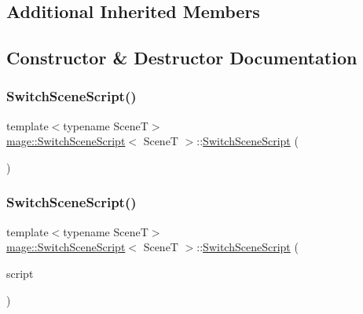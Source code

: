\subsection*{Additional Inherited Members}


\subsection{Constructor \& Destructor Documentation}
\hypertarget{classmage_1_1_switch_scene_script_aefd104d1ddabdd4709c8682e89c79655}{}\label{classmage_1_1_switch_scene_script_aefd104d1ddabdd4709c8682e89c79655} 
\subsubsection{\texorpdfstring{Switch\+Scene\+Script()}{SwitchSceneScript()}\hspace{0.1cm}{\footnotesize\ttfamily [1/3]}}
{\footnotesize\ttfamily template$<$typename SceneT$>$ \\
\hyperlink{classmage_1_1_switch_scene_script}{mage\+::\+Switch\+Scene\+Script}$<$ SceneT $>$\+::\hyperlink{classmage_1_1_switch_scene_script}{Switch\+Scene\+Script} (\begin{DoxyParamCaption}{ }\end{DoxyParamCaption})\hspace{0.3cm}{\ttfamily [explicit]}}

\hypertarget{classmage_1_1_switch_scene_script_a307db08624888173ab256b387f07f1c4}{}\label{classmage_1_1_switch_scene_script_a307db08624888173ab256b387f07f1c4} 
\subsubsection{\texorpdfstring{Switch\+Scene\+Script()}{SwitchSceneScript()}\hspace{0.1cm}{\footnotesize\ttfamily [2/3]}}
{\footnotesize\ttfamily template$<$typename SceneT$>$ \\
\hyperlink{classmage_1_1_switch_scene_script}{mage\+::\+Switch\+Scene\+Script}$<$ SceneT $>$\+::\hyperlink{classmage_1_1_switch_scene_script}{Switch\+Scene\+Script} (\begin{DoxyParamCaption}\item[{const \hyperlink{classmage_1_1_switch_scene_script}{Switch\+Scene\+Script}$<$ SceneT $>$ \&}]{script }\end{DoxyParamCaption})\hspace{0.3cm}{\ttfamily [delete]}}

